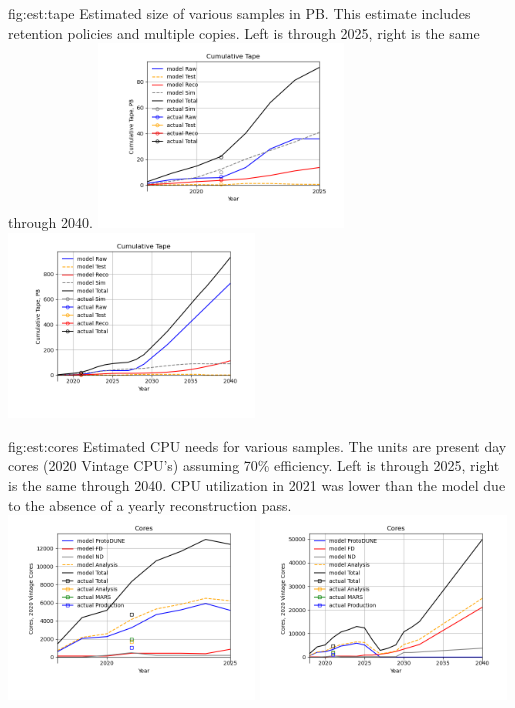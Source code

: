 \documentclass[../main-v1.tex]{subfiles}
\begin{document}
\begin{dunefigure}
{fig:est:tape}
{Estimated size of various samples in PB. This estimate includes retention policies and multiple copies. Left is through 2025, right is the same through 2040.}
\includegraphics[width=0.49\textwidth]{graphics/IntroFigures/2025/Parameters_2022-03-04-2025-Cumulative-Tape.png}
\includegraphics[width=0.49\textwidth]{graphics/IntroFigures/2040/Parameters_2022-03-04-2040-Cumulative-Tape.png}

\end{dunefigure}

\begin{dunefigure}
{fig:est:cores}
{Estimated CPU needs for  various samples.  The units are present day cores  (2020 Vintage CPU's) assuming 70\% efficiency. Left is through 2025, right is the same through 2040. CPU utilization in 2021 was lower than the model due to the absence of a yearly reconstruction pass.}
\includegraphics[width=0.49\textwidth]{graphics/IntroFigures/2025/Parameters_2022-03-04-2025-Cores.png}
\includegraphics[width=0.49\textwidth]{graphics/IntroFigures/2040/Parameters_2022-03-04-2040-Cores.png}
\end{dunefigure}
\end{document}
